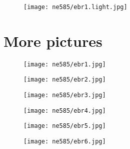 \documentclass[aspectratio=1610,pdftex,dvipsnames,compress,xcolor={dvipsnames}]{beamer}
\begin{document}
\begin{frame}{}
    \begin{figure}
        \centering
        \texttt{[image: ne585/ebr1.light.jpg]}
    \end{figure}
\end{frame}


\section{More pictures}


\addtocounter{framenumber}{-1} 
\begin{frame}{}
    \begin{figure}
        \centering
        \texttt{[image: ne585/ebr1.jpg]}
    \end{figure}
\end{frame}


\begin{frame}{}
    \begin{figure}
        \centering
        \texttt{[image: ne585/ebr2.jpg]}
    \end{figure}
\end{frame}


\begin{frame}{}
    \begin{figure}
        \centering
        \texttt{[image: ne585/ebr3.jpg]}
    \end{figure}
\end{frame}


\begin{frame}{}
    \begin{figure}
        \centering
        \texttt{[image: ne585/ebr4.jpg]}
    \end{figure}
\end{frame}


\begin{frame}{}
    \begin{figure}
        \centering
        \texttt{[image: ne585/ebr5.jpg]}
    \end{figure}
\end{frame}


\begin{frame}{}
    \begin{figure}
        \centering
        \texttt{[image: ne585/ebr6.jpg]}
    \end{figure}
\end{frame}
\end{document}
